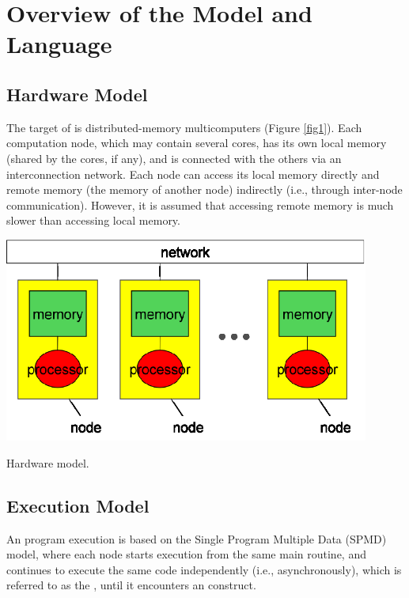 \chapter{Overview of the {\XMP} Model and Language}
\label{chap: overview}

\section{Hardware Model}

The target of {\XMP} is distributed-memory multicomputers (Figure
\ref{fig1}). Each computation node, which may contain several cores, has
its own local memory (shared by the cores, if any), and is connected
with the others via an interconnection network.
%
Each node can access its local memory directly and remote memory (the
memory of another node) indirectly (i.e., through inter-node 
communication). However, it is assumed that accessing remote memory is 
much slower than accessing local memory.

\begin{myfigure}
\includegraphics[width=12cm]{figs/Fig1.eps}
  \caption{Hardware model.}\label{fig1}
\end{myfigure}

\section{Execution Model}

An {\XMP} program execution is based on the Single Program Multiple Data
(SPMD) model, where each node starts execution from the same main
routine, and continues to execute the same code independently
(i.e., asynchronously), which is referred to as the {\it {}}, until it encounters an {\XMP} construct.

%

